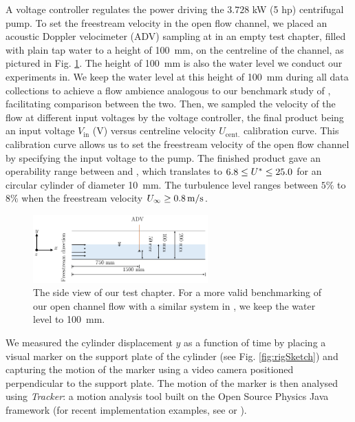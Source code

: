 \documentclass[oneside]{utmthesis}
\begin{document}
A voltage controller regulates the power driving the $3.728$ kW (5 hp) centrifugal pump. To set the freestream velocity in the open flow channel, we placed an acoustic Doppler velocimeter (ADV) sampling at in an empty test chapter, filled with plain tap water to a height of \SI{100}{\milli\metre}, on the centreline of the channel, as pictured in Fig. \ref{fig:channelSchematic}. The height of \SI{100}{\milli\metre} is also the water level we conduct our experiments in. We keep the water level at this height of \SI{100}{\milli\metre} during all data collections to achieve a flow ambience analogous to our benchmark study of \citet{Koide2013}, facilitating comparison between the two. Then, we sampled the velocity of the flow at different input voltages by the voltage controller, the final product being an input voltage $V_{\text{in}}$ (V) versus centreline velocity $U_{\text{cent.}}$ calibration curve. This calibration curve allows us to set the freestream velocity of the open flow channel by specifying the input voltage to the pump. The finished product gave an operability range between \uth{} and \uel{}, which translates to $6.8 \leq U^{*} \leq 25.0$ for an circular cylinder of diameter \SI{10}{\milli\metre}. The turbulence level ranges between $5\%$ to $8\%$ when the freestream velocity $U_{\infty} \geq \uei$.

\begin{figure}
  \centering
  \includegraphics[width=0.6\textwidth]{figs/channelSchematic}
  \caption{The side view of our test chapter. For a more valid benchmarking of our open channel flow with a similar system in \citet{Koide2013}, we keep the water level to \SI{100}{\milli\metre}.}
  \label{fig:channelSchematic}
\end{figure}

We measured the cylinder displacement $y$ as a function of time by placing a visual marker on the support plate of the cylinder (see Fig. \ref{fig:rigSketch}) and capturing the motion of the marker using a video camera positioned perpendicular to the support plate. The motion of the marker is then analysed using \textit{Tracker}: a motion analysis tool built on the Open Source Physics Java framework (for recent implementation examples, see \citet{Wen2020}  or \citet{Krishnendu2020}).
\end{document}
